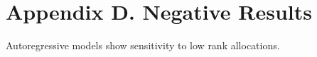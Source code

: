\section*{Appendix D. Negative Results}Autoregressive models show sensitivity to low rank allocations.
